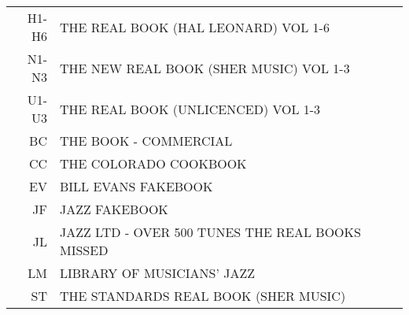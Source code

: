 \documentclass[8pt]{scrartcl}
\begin{document}
\selectfont
\begin{center}
  \begin{tabular}{r@{\quad=\quad}l}%
    H1-H6 & THE REAL BOOK (HAL LEONARD) VOL 1-6\\
    N1-N3 & THE NEW REAL BOOK (SHER MUSIC) VOL 1-3\\
    U1-U3 & THE REAL BOOK (UNLICENCED) VOL 1-3\\
    BC    & THE BOOK - COMMERCIAL\\
    CC    & THE COLORADO COOKBOOK\\
    EV    & BILL EVANS FAKEBOOK\\
    JF    & JAZZ FAKEBOOK\\
    JL    & JAZZ LTD - OVER 500 TUNES THE REAL BOOKS MISSED\\
    LM    & LIBRARY OF MUSICIANS’ JAZZ\\
    ST    & THE STANDARDS REAL BOOK (SHER MUSIC)\\
  \end{tabular}
\end{center}

\begin{multicols}{3}
  \raggedright
  
\end{multicols}
\end{document}
